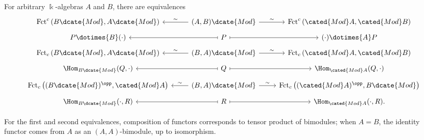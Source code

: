 \begin{theorem}\label{prop:Morita}
	For arbitrary $\Bbbk$-algebras $A$ and $B$, there are equivalences
	\[\begin{tikzcd}[row sep=tiny]
		\mathrm{Fct}^c\left(B\dcate{Mod}, A\dcate{Mod}\right) & (A, B)\dcate{Mod} \arrow[l, "\sim"'] \arrow[r, "\sim"] & \mathrm{Fct}^c\left(\cated{Mod}A, \cated{Mod}B\right) \\
		P \dotimes{B} (\cdot) & P \arrow[mapsto, l] \arrow[mapsto, r] & (\cdot) \dotimes{A} P \\
		\mathrm{Fct}_c\left(B\dcate{Mod}, A\dcate{Mod}\right) & (B, A)\dcate{Mod} \arrow[l, "\sim"'] \arrow[r, "\sim"] & \mathrm{Fct}_c\left(\cated{Mod}A, \cated{Mod}B\right) \\
		\Hom_{B\dcate{Mod}}(Q, \cdot) & Q \arrow[mapsto, l] \arrow[mapsto, r] & \Hom_{\cated{Mod}A}(Q, \cdot) \\
		\mathrm{Fct}_c\left((B\dcate{Mod})^{\opp}, \cated{Mod}A \right) & (B, A)\dcate{Mod} \arrow[l, "\sim"'] \arrow[r, "\sim"] & \mathrm{Fct}_c\left((\cated{Mod}A)^{\opp}, B\dcate{Mod}\right) \\
		\Hom_{B\dcate{Mod}}(\cdot, R) & R \arrow[mapsto, l] \arrow[mapsto, r] & \Hom_{\cated{Mod}A}(\cdot, R).
	\end{tikzcd}\]

	For the first and second equivalences, composition of functors corresponds
	to tensor product of bimodules; when $A=B$, the identity functor comes from
	$A$ as an $(A,A)$-bimodule, up to isomorphism.
\end{theorem}
